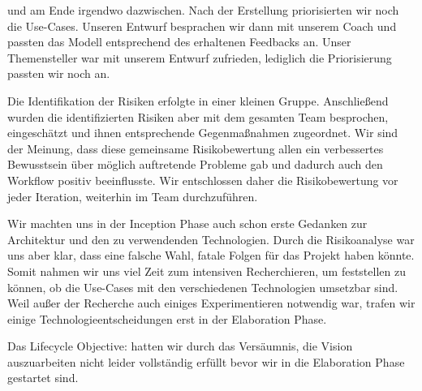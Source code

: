 \documentclass[10pt]{article}
\begin{document}
und am Ende irgendwo dazwischen. Nach der Erstellung priorisierten wir noch die Use-Cases. Unseren Entwurf besprachen
wir dann mit unserem Coach und passten das Modell entsprechend des erhaltenen Feedbacks an. Unser
Themensteller war mit unserem Entwurf zufrieden, lediglich die Priorisierung passten wir noch an.\par
\medskip
Die Identifikation der Risiken erfolgte in einer kleinen Gruppe. Anschließend wurden die identifizierten Risiken aber
mit dem gesamten Team besprochen, eingeschätzt und ihnen entsprechende Gegenmaßnahmen zugeordnet.
Wir sind der Meinung, dass diese gemeinsame Risikobewertung allen
ein verbessertes Bewusstsein über möglich auftretende Probleme gab und dadurch auch den Workflow positiv beeinflusste.
Wir entschlossen daher die Risikobewertung vor jeder Iteration, weiterhin im Team durchzuführen. \par
\medskip
Wir machten uns in der Inception Phase auch schon erste Gedanken zur Architektur und den zu verwendenden Technologien.
Durch die Risikoanalyse war uns aber klar, dass eine falsche Wahl, fatale Folgen für das Projekt haben könnte.
Somit nahmen wir uns viel Zeit zum intensiven Recherchieren, um feststellen zu können, ob die Use-Cases mit den
verschiedenen Technologien umsetzbar sind. Weil außer der Recherche auch einiges Experimentieren notwendig war,
trafen wir einige Technologieentscheidungen erst in der Elaboration Phase.\par
\medskip
Das Lifecycle Objective:  hatten wir durch das Versäumnis, die Vision
auszuarbeiten nicht leider vollständig erfüllt bevor wir in die Elaboration Phase gestartet sind.

\newpage
\end{document}
